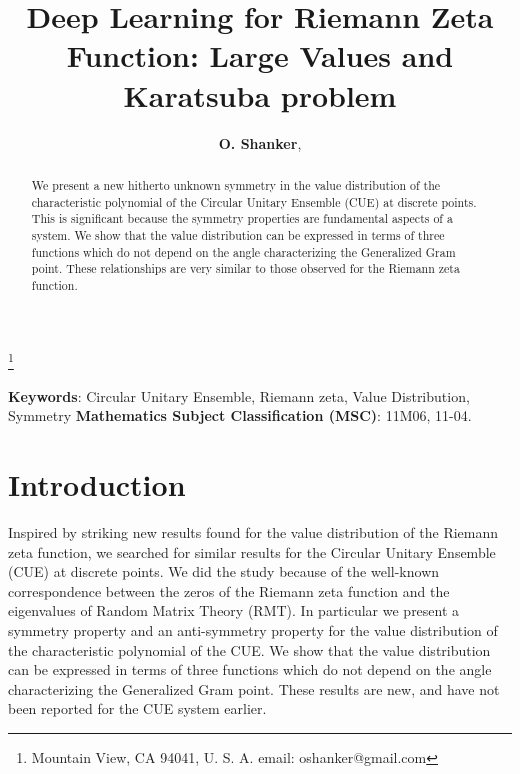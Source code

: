 \documentclass[twoside]{article}
\begin{document}


\newtheorem{theorem}{Theorem}[section]
\newtheorem{lemma}[theorem]{Lemma}

\theoremstyle{definition}
\newtheorem{definition}[theorem]{Definition}
\newtheorem{example}[theorem]{Example}
\newtheorem{xca}[theorem]{Exercise}

\theoremstyle{remark}
\newtheorem{remark}[theorem]{Remark}



\date{}
\lhead[]{}
\rhead[]{}

\title{\bf{Deep Learning for Riemann Zeta Function: Large Values and Karatsuba problem}}

\maketitle


\author{{\textbf{O. Shanker}},}
\thanks{ Mountain View, CA 94041, U. S. A. email: oshanker@gmail.com}

\thispagestyle{fancy}

\begin{abstract}
We present a new hitherto unknown symmetry in the value
distribution of the characteristic polynomial of the Circular Unitary Ensemble (CUE)
 at discrete points. This is significant because the symmetry properties
are fundamental aspects of a system. We show that the value distribution 
can be expressed in terms of three functions 
which do not depend on the angle characterizing the Generalized Gram point.
These relationships are very similar to those  observed for 
the Riemann zeta function.
\end{abstract}
{\textbf {Keywords}:} Circular Unitary Ensemble, Riemann zeta, Value Distribution, Symmetry 
{\textbf {Mathematics Subject Classification (MSC)}:} 11M06, 11-04.


\symbolfootnote[0]{*}


\section{Introduction}

Inspired by striking new results found for the value distribution of the Riemann zeta function,
we searched for similar results for the Circular Unitary Ensemble (CUE)
at discrete points. We did the study because of the well-known correspondence between the
zeros of the Riemann zeta function and the eigenvalues of Random Matrix Theory (RMT).
In particular we present a symmetry property and an anti-symmetry property for the value
distribution of the characteristic polynomial of the CUE. We show that the value distribution 
can be expressed in terms of three  functions 
which do not depend on the angle characterizing the Generalized Gram point. These results
are new, and have not been reported for the CUE system earlier.
\end{document}

